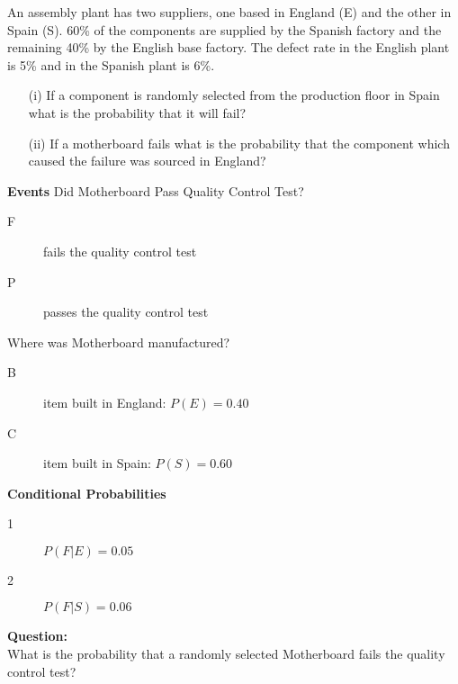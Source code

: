 An assembly plant has two suppliers, one based in England (E) and the other in Spain (S).  
60\% of the components are supplied by the Spanish factory and the remaining 40\% by the English base factory.  
The defect rate in the English plant is 5\% and in the Spanish plant is 6\%.

\begin{itemize}
\item[(i)]If a component is randomly selected from the production floor in Spain what is the probability that it will fail?
\item[(ii)]If a motherboard fails what is the probability that the component which caused the failure was sourced in England?
\end{itemize}



\begin{framed}
\noindent \textbf{Events}
Did Motherboard Pass Quality Control Test?
\begin{description}
\item[F] fails the quality control test
\item[P] passes the quality control test
\end{description}
Where was Motherboard manufactured?
\begin{multicols}{2}
\begin{description}
\item[B] item built in England: $P(E) = 0.40$
\item[C] item built in Spain:  $P(S) = 0.60$
\end{description}
\end{multicols}
\end{framed}

\begin{framed}
\noindent \textbf{Conditional Probabilities}
\begin{multicols}{2}
\begin{description}
\item[1] $P(F|E) = 0.05$
\item[2] $P(F|S) = 0.06$

\end{description}
\end{multicols}
\end{framed}


\noindent \textbf{Question:} \\ What is the probability that a randomly selected Motherboard fails the quality control test?\\

